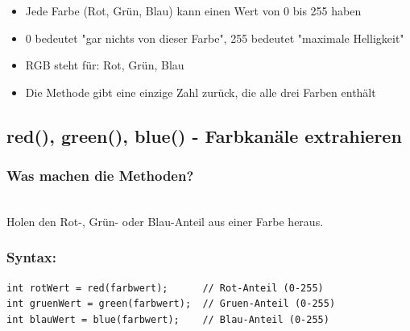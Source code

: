 \begin{achtung}
	\begin{itemize}
		\item Jede Farbe (Rot, Grün, Blau) kann einen Wert von 0 bis 255 haben
		\item 0 bedeutet "gar nichts von dieser Farbe", 255 bedeutet "maximale Helligkeit"
		\item RGB steht für: Rot, Grün, Blau
		\item Die Methode gibt eine einzige Zahl zurück, die alle drei Farben enthält
	\end{itemize}
\end{achtung}

\newpage


\subsection*{red(), green(), blue() - Farbkanäle extrahieren}

\subsubsection*{Was machen die Methoden?}\\
Holen den Rot-, Grün- oder Blau-Anteil aus einer Farbe heraus.

\subsubsection*{Syntax:}
\begin{lstlisting}
int rotWert = red(farbwert);      // Rot-Anteil (0-255)
int gruenWert = green(farbwert);  // Gruen-Anteil (0-255)
int blauWert = blue(farbwert);    // Blau-Anteil (0-255)
\end{lstlisting}

